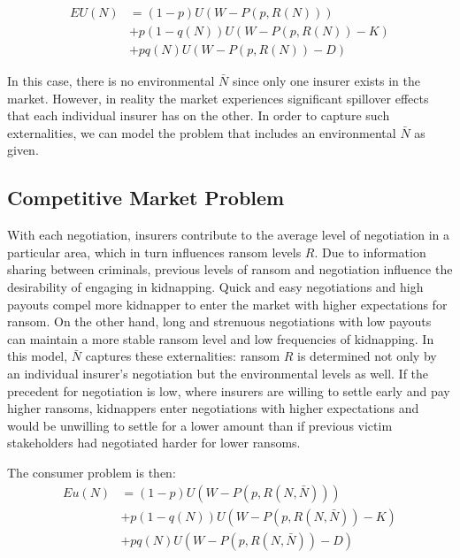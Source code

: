 \documentclass[12pt]{article}
\begin{document}
\begin{align*}
EU(N) &= (1-p)U(W-P(p, R(N))) \\
&+ p(1-q(N))U(W-P(p, R(N))-K) \\
&+ pq(N)U(W-P(p, R(N))-D)
\end{align*}

In this case, there is no environmental $\bar{N}$ since only one insurer exists in the market. However, in reality the market experiences significant spillover effects that each individual insurer has on the other. In order to capture such externalities, we can model the problem that includes an environmental $\bar{N}$ as given.

\subsection{Competitive Market Problem}

With each negotiation, insurers contribute to the average level of negotiation in a particular area, which in turn influences ransom levels $R$. Due to information sharing between criminals, previous levels of ransom and negotiation influence the desirability of engaging in kidnapping. Quick and easy negotiations and high payouts compel more kidnapper to enter the market with higher expectations for ransom. On the other hand, long and strenuous negotiations with low payouts can maintain a more stable ransom level and low frequencies of kidnapping. In this model, $\bar{N}$ captures these externalities: ransom $R$ is determined not only by an individual insurer's negotiation but the environmental levels as well. If the precedent for negotiation is low, where insurers are willing to settle early and pay higher ransoms, kidnappers enter negotiations with higher expectations and would be unwilling to settle for a lower amount than if previous victim stakeholders had negotiated harder for lower ransoms. 

The consumer problem is then:
\begin{align*}
Eu(N) &= (1-p)U(W-P(p, R(N, \bar{N}))) \\
&+ p(1-q(N))U(W-P(p, R(N, \bar{N}))-K) \\
&+ pq(N)U(W-P(p, R(N, \bar{N}))-D)
\end{align*}
\end{document}
